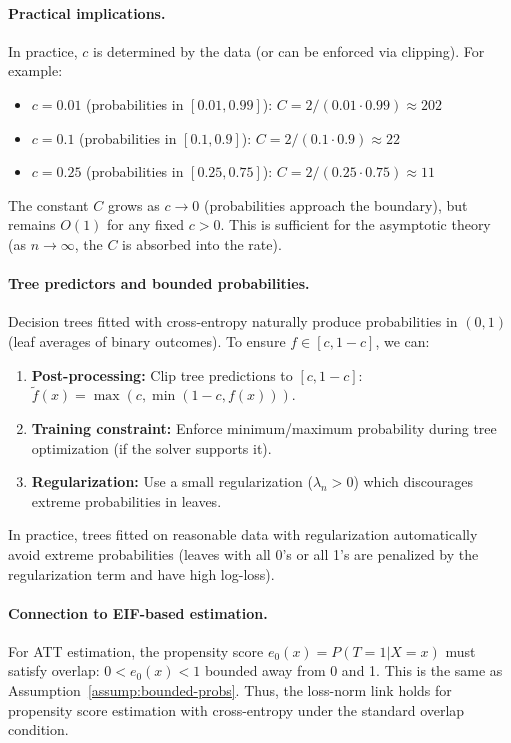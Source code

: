 \documentclass[12pt]{article}
\begin{document}
\paragraph{Practical implications.}
In practice, $c$ is determined by the data (or can be enforced via clipping). For example:
\begin{itemize}
\item $c = 0.01$ (probabilities in $[0.01, 0.99]$): $C = 2/(0.01 \cdot 0.99) \approx 202$
\item $c = 0.1$ (probabilities in $[0.1, 0.9]$): $C = 2/(0.1 \cdot 0.9) \approx 22$
\item $c = 0.25$ (probabilities in $[0.25, 0.75]$): $C = 2/(0.25 \cdot 0.75) \approx 11$
\end{itemize}

The constant $C$ grows as $c \to 0$ (probabilities approach the boundary), but remains $O(1)$ for any fixed $c > 0$. This is sufficient for the asymptotic theory (as $n \to \infty$, the $C$ is absorbed into the rate).

\paragraph{Tree predictors and bounded probabilities.}
Decision trees fitted with cross-entropy naturally produce probabilities in $(0,1)$ (leaf averages of binary outcomes). To ensure $f \in [c, 1-c]$, we can:
\begin{enumerate}
\item \textbf{Post-processing:} Clip tree predictions to $[c, 1-c]$: $\tilde{f}(x) = \max(c, \min(1-c, f(x)))$.
\item \textbf{Training constraint:} Enforce minimum/maximum probability during tree optimization (if the solver supports it).
\item \textbf{Regularization:} Use a small regularization ($\lambda_n > 0$) which discourages extreme probabilities in leaves.
\end{enumerate}

In practice, trees fitted on reasonable data with regularization automatically avoid extreme probabilities (leaves with all 0's or all 1's are penalized by the regularization term and have high log-loss).

\paragraph{Connection to EIF-based estimation.}
For ATT estimation, the propensity score $e_0(x) = P(T=1|X=x)$ must satisfy overlap: $0 < e_0(x) < 1$ bounded away from 0 and 1. This is the same as Assumption~\ref{assump:bounded-probs}. Thus, the loss-norm link holds for propensity score estimation with cross-entropy under the standard overlap condition.
\end{document}
